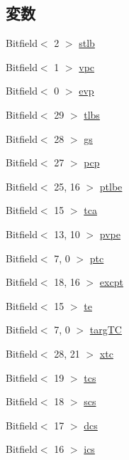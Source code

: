 \subsection*{変数}
\begin{DoxyCompactItemize}
\item 
Bitfield$<$ 2 $>$ \hyperlink{namespaceMipsISA_a765b759a1cbf0327c976fce610644699}{stlb}
\item 
Bitfield$<$ 1 $>$ \hyperlink{namespaceMipsISA_ae4fb9014ffa95845f9d0c9c9a1c5954d}{vpc}
\item 
Bitfield$<$ 0 $>$ \hyperlink{namespaceMipsISA_af5e279b88e23bebd414c54ed2271f69d}{evp}
\item 
Bitfield$<$ 29 $>$ \hyperlink{namespaceMipsISA_af1e97becf027069cbed0429d0daa8c48}{tlbs}
\item 
Bitfield$<$ 28 $>$ \hyperlink{namespaceMipsISA_a2b7eea2f417bdbde7ce0f944dd01121e}{gs}
\item 
Bitfield$<$ 27 $>$ \hyperlink{namespaceMipsISA_a1efb33f5aecd77dfeea63cf2f606c215}{pcp}
\item 
Bitfield$<$ 25, 16 $>$ \hyperlink{namespaceMipsISA_a0e862ab1744bdf5a4592a1f8851bd57e}{ptlbe}
\item 
Bitfield$<$ 15 $>$ \hyperlink{namespaceMipsISA_a021afc36de58d4a3aa06ad2bd9742b5c}{tca}
\item 
Bitfield$<$ 13, 10 $>$ \hyperlink{namespaceMipsISA_a35877fdce2983423c8361825cd61d1f4}{pvpe}
\item 
Bitfield$<$ 7, 0 $>$ \hyperlink{namespaceMipsISA_a48d86789028b9aaae934996426cf0ccb}{ptc}
\item 
Bitfield$<$ 18, 16 $>$ \hyperlink{namespaceMipsISA_a58c4c329e72fc28d6945a399bb0ccbc3}{excpt}
\item 
Bitfield$<$ 15 $>$ \hyperlink{namespaceMipsISA_a49c5c4308a3fe2af210c807bd186b780}{te}
\item 
Bitfield$<$ 7, 0 $>$ \hyperlink{namespaceMipsISA_afa11785f98e7266a3c2bc420015b5218}{targTC}
\item 
Bitfield$<$ 28, 21 $>$ \hyperlink{namespaceMipsISA_a3ea65eea5f2ecf01c1c0aace750b5cce}{xtc}
\item 
Bitfield$<$ 19 $>$ \hyperlink{namespaceMipsISA_a612204b5b1220c8a39441982eadc4fa6}{tcs}
\item 
Bitfield$<$ 18 $>$ \hyperlink{namespaceMipsISA_a70ab86e033d1b511ca553b4bf9957427}{scs}
\item 
Bitfield$<$ 17 $>$ \hyperlink{namespaceMipsISA_ae53a1092a5d5027717afd4dd7801e1f2}{dcs}
\item 
Bitfield$<$ 16 $>$ \hyperlink{namespaceMipsISA_a7588be2818307aa7a847cfaf48cef2f5}{ics}

\end{DoxyCompactItemize}

